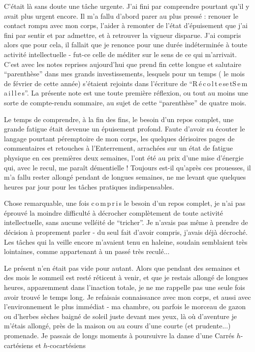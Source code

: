 C'était là sans doute une tâche urgente. J'ai fini par comprendre pourtant qu'il y avait plus urgent encore. Il m'a fallu d'abord parer au plus pressé : renouer le contact rompu avec mon corps, l'aider à remonter de l'état d'épuisement que j'ai fini par sentir et par admettre, et à retrouver la vigueur disparue. J'ai compris alors que pour cela, il fallait que je renonce pour une durée indéterminée à toute activité intellectuelle - fut-ce celle de méditer sur le sens de ce qui m'arrivait. C'est avec les notes reprises aujourd'hui que prend fin cette longue et salutaire ``parenthèse'' dans mes grands investissements, lesquels pour un temps ( le mois de février de cette année) s'étaient rejoints dans l'écriture de ``R\,é\,c\,o\,l\,t\,e\,s\quad e\,t\quad S\,e\,m\,a\,i\,l\,l\,e\,s''. La présente note est une toute première réflexion, ou tout au moins une sorte de compte-rendu sommaire, au sujet de cette ``parenthèse'' de quatre mois.

Le temps de comprendre, à la fin des fins, le besoin d'un repos complet, une grande fatigue était devenue un épuisement profond. Faute d'avoir su écouter le langage pourtant péremptoire de mon corps, les quelques dérisoires pages de commentaires et retouches à l'Enterrement, arrachées sur un état de fatigue physique en ces premières deux semaines, l'ont été au prix d'une mise d'énergie qui, avec le recul, me paraît démentielle ! Toujours est-il qu'après ces prouesses, il m'a fallu rester allongé pendant de longues semaines, ne me levant que quelques heures par jour pour les tâches pratiques indispensables.

Chose remarquable, une fois c\,o\,m\,p\,r\,i\,s le besoin d'un repos complet, je n'ai pas éprouvé la moindre difficulté à décrocher complètement de toute activité intellectuelle, sans aucune velléité de ``tricher''. Je n'avais pas même à prendre de décision à proprement parler - du seul fait d'avoir compris, j'avais déjà décroché. Les tâches qui la veille encore m'avaient tenu en haleine, soudain semblaient très lointaines, comme appartenant à un passé très reculé...

Le présent n'en était pas vide pour autant. Alors que pendant des semaines et des mois le sommeil est resté réticent à venir, et que je restais allongé de longues heures, apparemment dans l'inaction totale, je ne me rappelle pas une seule fois avoir trouvé le temps long. Je refaisais connaissance avec mon corps, et aussi avec l'environnement le plus immédiat - ma chambre, ou parfois le morceau de gazon ou d'herbes sèches baigné de soleil juste devant mes yeux, là où d'aventure je m'étais allongé, près de la maison ou au cours d'une courte (et prudente...) promenade. Je passais de longs moments à poursuivre la danse d'une
Carrés $h$-cartésiens et $h$-cocartésiens

